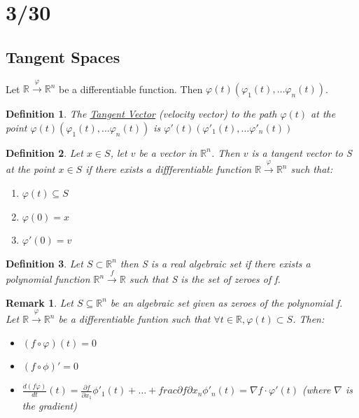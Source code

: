 \documentclass{article}
\newtheorem{definition}{Definition}
\newtheorem{remark}{Remark}
\begin{document}
\section{3/30}
\subsection{Tangent Spaces}
Let $\mathbb{R} \overset{\varphi}{\to} \mathbb{R}^n$ be a differentiable function. Then $\varphi(t) (\varphi_1(t), \dots \varphi_n(t))$.
\begin{definition}
  The \underline{Tangent Vector} (velocity vector) to the path $\varphi(t)$ at the point $\varphi(t) (\varphi_1(t), \dots \varphi_n(t))$ is $\varphi'(t) (\varphi'_1(t), \dots \varphi'_n(t))$
\end{definition}
\begin{definition}
  Let $x \in S$, let $v$ be a vector in $\mathbb{R}^n$. Then $v$ is a tangent vector to S at the point $x \in S$ if there exists a diffferentiable function $\mathbb{R} \overset{\varphi}{\to} \mathbb{R}^n$ such that:
  \begin{enumerate}
    \item $\varphi(t) \subseteq S$
    \item $\varphi(0) = x$
    \item $\varphi'(0) = v$
  \end{enumerate}
\end{definition}
\begin{definition}
  Let $S \subset \mathbb{R}^n$ then S is a real algebraic set if there exists a polynomial function $\mathbb{R}^n \overset{f}{\to} \mathbb{R}$ such that S is the set of zeroes of f.
\end{definition}
\begin{remark}
  Let $S \subseteq \mathbb{R}^n$ be an algebraic set given as zeroes of the polynomial f. Let $\mathbb{R} \overset{\varphi}{\to} \mathbb{R}^n$ be a differentiable funtion such that $\forall t \in \mathbb{R}, \varphi(t) \subset S$. Then:
  \begin{itemize}
    \item $(f \circ \varphi)(t) = 0$ 
    \item $(f \circ \phi)' = 0$
    \item $\frac{d(f\varphi)}{dt}(t) = \frac{\partial f}{\partial x_1}\phi'_1(t) + \dots + frac{\partial f}{\partial x_n}\phi'_n(t) = \nabla f \cdot \varphi'(t)$ (where $\nabla$ is the gradient)
  \end{itemize}
\end{remark}
\end{document}
